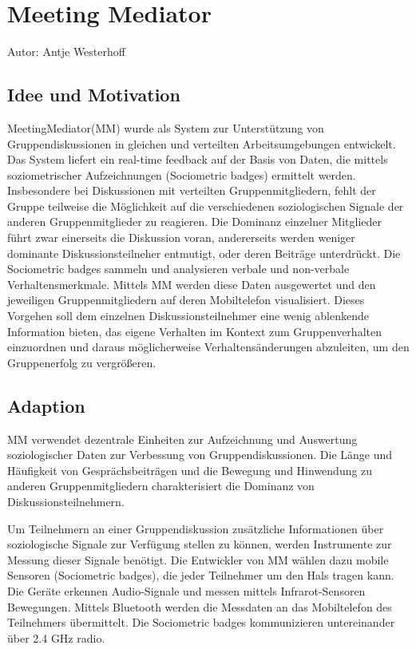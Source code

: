 \section{Meeting Mediator}
Autor: Antje Westerhoff

\subsection{Idee und Motivation}
MeetingMediator(MM) wurde als System zur Unterstützung von Gruppendiskussionen
in gleichen und verteilten Arbeitsumgebungen entwickelt. Das System liefert ein
real-time feedback auf der Basis von Daten, die mittels soziometrischer
Aufzeichnungen (Sociometric badges) ermittelt werden.
Insbesondere bei Diskussionen mit verteilten Gruppenmitgliedern, fehlt der
Gruppe teilweise die Möglichkeit auf die verschiedenen soziologischen Signale
der anderen Gruppenmitglieder zu reagieren. Die Dominanz einzelner Mitglieder
führt zwar einerseits die Diskussion voran, andererseits werden weniger
dominante Diskussionsteilneher entmutigt, oder deren Beiträge unterdrückt.
Die Sociometric badges sammeln und analysieren verbale und non-verbale
Verhaltensmerkmale. Mittels MM werden diese Daten ausgewertet und den jeweiligen Gruppenmitgliedern auf deren Mobiltelefon visualisiert. Dieses Vorgehen soll dem einzelnen Diskussionsteilnehmer eine wenig ablenkende Information bieten, das eigene Verhalten im Kontext zum
Gruppenverhalten einzuordnen und daraus möglicherweise Verhaltensänderungen
 abzuleiten, um den Gruppenerfolg zu vergrößeren.

\subsection{Adaption}
MM verwendet dezentrale Einheiten zur Aufzeichnung und Auswertung soziologischer
Daten zur Verbessung von Gruppendiskussionen.
Die Länge und Häufigkeit von Gesprächsbeiträgen und die Bewegung und Hinwendung
zu anderen Gruppenmitgliedern charakterisiert die Dominanz von
Diskussionsteilnehmern.

Um Teilnehmern an einer Gruppendiskussion zusätzliche
Informationen über soziologische Signale zur Verfügung stellen zu können, werden Instrumente zur Messung dieser Signale benötigt. Die Entwickler von MM wählen dazu mobile
Sensoren (Sociometric badges), die jeder Teilnehmer um den Hals tragen kann.
Die Geräte erkennen Audio-Signale und messen mittels Infrarot-Sensoren
Bewegungen. Mittels Bluetooth werden die Messdaten an das Mobiltelefon des
Teilnehmers übermittelt. Die Sociometric badges kommunizieren untereinander über
2.4 GHz radio.

